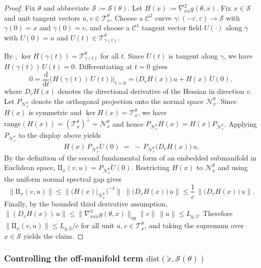 \documentclass{article}
\theoremstyle{normaltheorem}
\newcommand{\ud}{\mathrm{d}}
\newcommand{\calS}{\mathcal{S}}
\newcommand{\calT}{\mathcal{T}}
\newcommand{\calN}{\mathcal{N}}
\begin{document}
\begin{proof}
Fix $\theta$ and abbreviate \(\mathcal{S}:=\calS(\theta)\).
Let $H(x):=\nabla^2_{xx}g(\theta,x)$.
Fix $x\in \mathcal{S}$ and unit tangent vectors $u,v\in\calT_x^\theta$.
Choose a $\mathcal{C}^{2}$ curve $\gamma:(-\varepsilon,\varepsilon)\to \mathcal{S}$ with $\gamma(0)=x$ and $\dot\gamma(0)=v$,
and choose a $\mathcal{C}^{1}$ tangent vector field $U(\cdot)$ along $\gamma$ with $U(0)=u$ and $U(t)\in\calT_{\gamma(t)}^\theta$.

By , \(\ker H(\gamma(t))=\calT_{\gamma(t)}^\theta\) for all \(t\). Since \(U(t)\) is tangent along
\(\gamma\), we have \(H(\gamma(t))\,U(t)=0\).
Differentiating at $t=0$ gives
\[
0
=\frac{\ud}{\ud t}\Big(H(\gamma(t))\,U(t)\Big)\Big|_{t=0}
=\big(D_v H(x)\big)\,u+H(x)\,\dot U(0),
\]
where $D_v H(x)$ denotes the directional derivative of the Hessian in direction $v$.
Let $P_{\calN_x^\theta}$ denote the orthogonal projection onto the normal space $\calN_x^\theta$.
Since $H(x)$ is symmetric and $\ker H(x)=\calT_x^\theta$, we have $\mathrm{range}(H(x))=(\calT_x^\theta)^\perp=\calN_x^\theta$ and hence
$P_{\calN_x^\theta}H(x)=H(x)P_{\calN_x^\theta}$.
Applying $P_{\calN_x^\theta}$ to the display above yields
\[
H(x)\,P_{\calN_x^\theta}\dot U(0) \;=\; -\,P_{\calN_x^\theta}\big(D_v H(x)\big)\,u.
\]
By the definition of the second fundamental form of an embedded submanifold in Euclidean space,
$\mathrm{II}_x(v,u)=P_{\calN_x^\theta}\dot U(0)$.
Restricting $H(x)$ to $\calN_x^\theta$ and using the uniform normal spectral gap gives
\[
\|\mathrm{II}_x(v,u)\|
\le \big\|\big(H(x)|_{\calN_x^\theta}\big)^{-1}\big\|\;\big\|\big(D_v H(x)\big)\,u\big\|
\le \frac{1}{c}\,\big\|\big(D_v H(x)\big)\,u\big\|.
\]
Finally, by the bounded third derivative assumption,
\(
\|(D_v H(x))\,u\|\le \|\nabla^3_{xxx}g(\theta,x)\|_{\mathrm{op}}\|v\|\,\|u\|\le L_{g,3}.
\)
Therefore $\|\mathrm{II}_x(v,u)\|\le L_{g,3}/c$ for all unit $u,v\in\calT_x^\theta$, and taking the supremum over $x\in \mathcal{S}$ yields the claim.
\end{proof}






\subsubsection{Controlling the off-manifold term $\mathrm{dist}(\tilde x,\calS(\theta))$}
\end{document}
